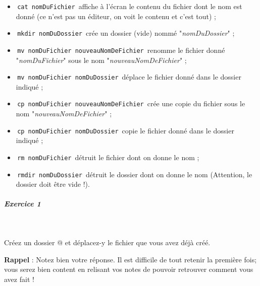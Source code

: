 \documentclass[11pt,a4paper]{article}
\begin{document}
					\begin{itemize}
				
			\item \,\verb|cat nomDuFichier|\,
						affiche \`a l'\'ecran le contenu du fichier dont le nom est donn\'e 
						(ce n'est pas un \'editeur, on voit le contenu et c'est tout) ;
					
			\item \,\verb|mkdir nomDuDossier|\,
						cr\'ee un dossier (vide) nomm\'e "\textit{nomDuDossier}" ;
					
			\item \,\verb|mv nomDuFichier nouveauNomDeFichier|\,
						renomme le fichier donn\'e "\textit{nomDuFichier}" sous le nom "\textit{nouveauNomDeFichier}" ;
					
			\item \,\verb|mv nomDuFichier nomDuDossier|\,
						d\'eplace le fichier donn\'e dans le dossier indiqu\'e ;
					
			\item \,\verb|cp nomDuFichier nouveauNomDeFichier|\,
						cr\'ee une copie du fichier sous le nom "\textit{nouveauNomDeFichier}" ;
					
			\item \,\verb|cp nomDuFichier nomDuDossier|\,
						copie le fichier donn\'e dans le dossier indiqu\'e ;
					
			\item \,\verb|rm nomDuFichier|\,
						d\'etruit le fichier dont on donne le nom ;
					
			\item \,\verb|rmdir nomDuDossier|\,
						d\'etruit le dossier dont on donne le nom (Attention, le dossier doit \^etre vide !).
					
					\end{itemize}
				
			
		\subparagraph{Exercice 1} 
		
					\textcolor{white}{.} \par
				
            \par
        
					Cr\'eez un dossier @
					et d\'eplacez-y le fichier \verb@test@ que vous avez d\'ej\`a cr\'e\'e.
				
            \par
        \textbf{Rappel} :
					Notez bien votre r\'eponse.
					Il est difficile de tout retenir la premi\`ere fois;
					vous serez bien content en relisant vos notes de pouvoir retrouver comment vous avez fait !
				
\end{document}

